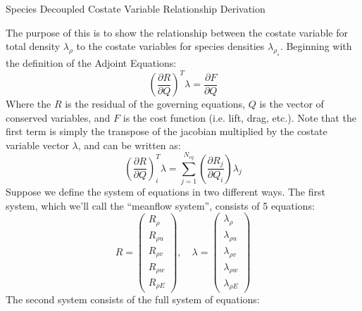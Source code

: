 \documentclass[10pt]{article}
\begin{document}
\centerline{Species Decoupled Costate Variable Relationship Derivation}

\vspace{.2in}

The purpose of this is to show the relationship between the costate variable for total density $\lambda_\rho$ to the costate variables for species densities $\lambda_{\rho_s}$. Beginning with the definition of the Adjoint Equations:
\begin{equation}
  \left(\frac{\partial R}{\partial Q}\right)^T\lambda = \frac{\partial F}{\partial Q}
  \label{adj_eqn}
\end{equation}
Where the $R$ is the residual of the governing equations, $Q$ is the vector of conserved variables, and $F$ is the cost function (i.e. lift, drag, etc.). Note that the first term is simply the transpose of the jacobian multiplied by the costate variable vector $\lambda$, and can be written as:
\begin{equation}
  \left(\frac{\partial R}{\partial Q}\right)_i^T \lambda 
  = \sum_{j=1}^{N_{eq}}{
    \left(\frac{\partial R_j}{\partial Q_i}\right) \lambda_j}
  \label{lhs_sum}
\end{equation}
Suppose we define the system of equations in two different ways.  The first system, which we'll call the ``meanflow system'', consists of 5 equations:
\begin{equation}
  R = \begin{pmatrix} 
        R_{\rho} \\ R_{\rho u} \\ R_{\rho v} \\ R_{\rho w} \\ R_{\rho E}
      \end{pmatrix}, \quad
      \lambda = \begin{pmatrix}
        \lambda_\rho \\ \lambda_{\rho u} \\ \lambda_{\rho v} \\ \lambda_{\rho w} \\
        \lambda_{\rho E}
      \end{pmatrix}
  \label{5x5}
\end{equation}
The second system consists of the full system of equations:
\end{document}
